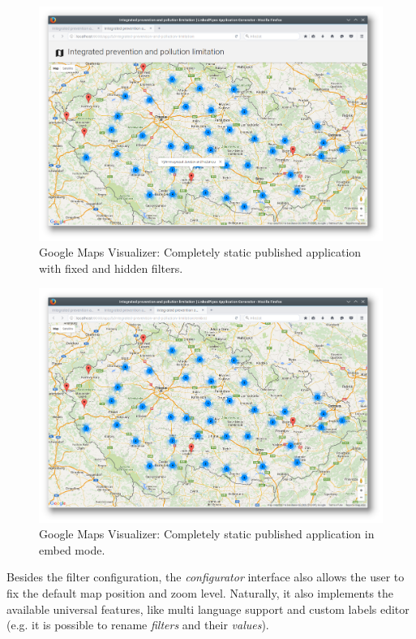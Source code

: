 \begin{figure}
	\centering
	\includegraphics[width=145mm]{img/06_map_published_static}
	\caption{Google Maps Visualizer: Completely static published application with fixed and hidden filters.}
    \label{fig:map-published-static}
\end{figure}
\begin{figure}
	\centering
	\includegraphics[width=145mm]{img/06_map_published_embed}
	\caption{Google Maps Visualizer: Completely static published application in embed mode.}
    \label{fig:map-published-embed}
\end{figure}

Besides the filter configuration, the \emph{configurator} interface also allows the user to fix the default map position and zoom level. Naturally, it also implements the available universal features, like multi language support and custom labels editor (e.g. it is possible to rename \emph{filters}  and their \emph{values}).

